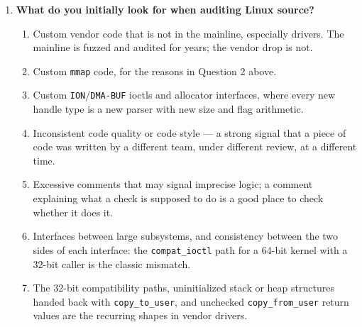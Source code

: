 \documentclass[12pt]{Training}
\begin{document}
\begin{enumerate}
\begin{enumerate}
        \item File systems: \lstinline{ext4} (Android's principal file system) supports extended attributes and therefore native SELinux labeling; so do \lstinline{f2fs}, \lstinline{xfs} and \lstinline{btrfs}. \lstinline{vfat}/\lstinline{exfat} have no extended attributes, so the Android kernel compensates with hard-coded contexts supplied by the FUSE \lstinline{sdcard} daemon (formerly the \lstinline{sdcardfs} kernel shim) and with \lstinline{genfs_contexts} entries, or with the \lstinline{context=} mount option for removable media.
        \item Android specifics: SELinux is enforcing by default since Android 5.0 (permissive by default from 4.3), the policy is split into \lstinline{plat}/\lstinline{vendor}/\lstinline{product} partitions, and \lstinline{neverallow} rules constrain what a vendor policy can grant. Because it is a policy, not a bug boundary, a driver reachable by a labeled domain is reachable: SELinux changes who can reach the surface, never whether the surface has bugs.
    \end{enumerate}
    \item \textbf{What do you initially look for when auditing Linux source?}
    \begin{enumerate}
        \item Custom vendor code that is not in the mainline, especially drivers. The mainline is fuzzed and audited for years; the vendor drop is not.
        \item Custom \lstinline{mmap} code, for the reasons in Question 2 above.
        \item Custom \lstinline{ION}/\lstinline{DMA-BUF} ioctls and allocator interfaces, where every new handle type is a new parser with new size and flag arithmetic.
        \item Inconsistent code quality or code style --- a strong signal that a piece of code was written by a different team, under different review, at a different time.
        \item Excessive comments that may signal imprecise logic; a comment explaining what a check is supposed to do is a good place to check whether it does it.
        \item Interfaces between large subsystems, and consistency between the two sides of each interface: the \lstinline{compat_ioctl} path for a 64-bit kernel with a 32-bit caller is the classic mismatch.
        \item The 32-bit compatibility paths, uninitialized stack or heap structures handed back with \lstinline{copy_to_user}, and unchecked \lstinline{copy_from_user} return values are the recurring shapes in vendor drivers.
    \end{enumerate}
\end{enumerate}
\end{document}
